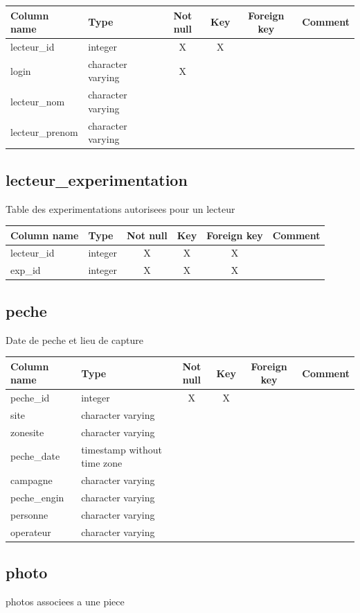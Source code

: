\begin{tabular}{|l| p{2cm}|c|c|c| p{3cm}|}
\hline
Column name & Type & Not null & Key & Foreign key & Comment \\
\hline
lecteur\_id & integer & X & X & & \\
\hline
login & character varying & X & & & \\
\hline
lecteur\_nom & character varying & & & & \\
\hline
lecteur\_prenom & character varying & & & & \\
\hline
\end{tabular}
\subsection{lecteur\_experimentation}
Table des experimentations autorisees pour un lecteur

\begin{tabular}{|l| p{2cm}|c|c|c| p{3cm}|}
\hline
Column name & Type & Not null & Key & Foreign key & Comment \\
\hline
lecteur\_id & integer & X & X & X & \\
\hline
exp\_id & integer & X & X & X & \\
\hline
\end{tabular}
\subsection{peche}
Date de peche et lieu de capture

\begin{tabular}{|l| p{2cm}|c|c|c| p{3cm}|}
\hline
Column name & Type & Not null & Key & Foreign key & Comment \\
\hline
peche\_id & integer & X & X & & \\
\hline
site & character varying & & & & \\
\hline
zonesite & character varying & & & & \\
\hline
peche\_date & timestamp without time zone & & & & \\
\hline
campagne & character varying & & & & \\
\hline
peche\_engin & character varying & & & & \\
\hline
personne & character varying & & & & \\
\hline
operateur & character varying & & & & \\
\hline
\end{tabular}
\subsection{photo}
photos associees a une piece

